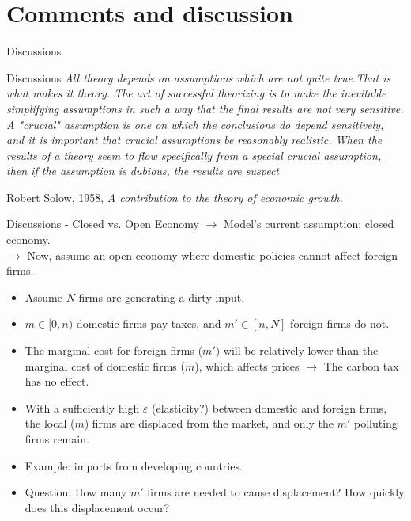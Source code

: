 \documentclass[aspectratio=169,xcolor=dvipsnames]{beamer}
\begin{document}
\section{Comments and discussion}

\begin{frame}{}
\centering
\Large Discussions 
\end{frame}



\begin{frame}{Discussions}
        \textit{All theory depends on assumptions which are not quite true.That is what makes it theory. The art of successful theorizing is to make the inevitable simplifying assumptions in such a way that the final results are not very sensitive. A "crucial" assumption is one on which the conclusions do depend sensitively, and it is important that crucial assumptions be reasonably realistic. When the results of a theory seem to flow specifically from a special crucial assumption, then if the assumption is dubious, the results are suspect}
        \vspace{0.5cm}

        Robert Solow, 1958, \textit{A contribution to the theory of economic growth.}
\end{frame}

\begin{frame}{Discussions - Closed vs. Open Economy}
    $\rightarrow$ Model's current assumption: closed economy. \\
    $\rightarrow$ Now, assume an open economy where domestic policies cannot affect foreign firms.
    \begin{itemize}
        \item Assume $N$ firms are generating a dirty input.
        \item $m \in [0,n)$ domestic firms pay taxes, and $m' \in [n,N]$ foreign firms do not.
        \item The marginal cost for foreign firms ($m'$) will be relatively lower than the marginal cost of domestic firms ($m$), which affects prices $\rightarrow$ The carbon tax has no effect.
        \item With a sufficiently high $\varepsilon$ (elasticity?) between domestic and foreign firms, the local ($m$) firms are displaced from the market, and only the $m'$ polluting firms remain.
        \item Example: imports from developing countries.  
        \item Question: How many $m'$ firms are needed to cause displacement? How quickly does this displacement occur?
    \end{itemize}
\end{frame}
\end{document}
